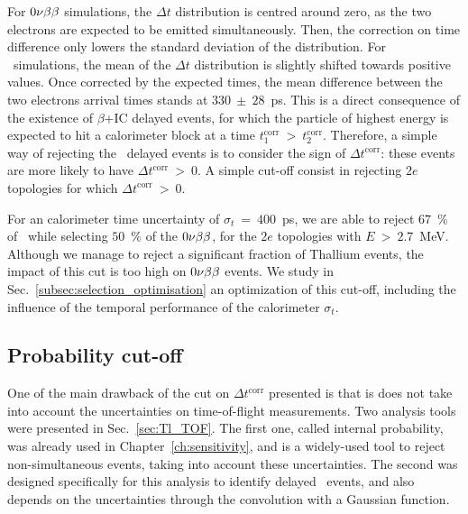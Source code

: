 For $0\nu\beta\beta$ simulations, the $\Delta t$ distribution is centred around zero, as the two electrons are expected to be emitted simultaneously.
Then, the correction on time difference only lowers the standard deviation of the distribution.
For \Tl\ simulations, the mean of the $\Delta t$ distribution is slightly shifted towards positive values.
Once corrected by the expected times, the mean difference between the two electrons arrival times stands at $330~\pm~28$~ps.
This is a direct consequence of the existence of $\beta$+IC delayed events, for which the particle of highest energy is expected to hit a calorimeter block at a time $t^{\text{corr}}_{1}~>~t^{\text{corr}}_{2}$.
Therefore, a simple way of rejecting the \Tl\ delayed events is to consider the sign of $\Delta t^{\text{corr}}$: these events are more likely to have $\Delta t^{\text{corr}}~>~0$.
A simple cut-off consist in rejecting $2e$ topologies for which $\Delta t^{\text{corr}}~>~0$.

For an calorimeter time uncertainty of $\sigma_{t}~=~400$~ps, we are able to reject $67$~\% of \Tl\, while selecting $50$~\% of the $0\nu\beta\beta$, for the $2e$ topologies with $E~>~2.7$~MeV.
Although we manage to reject a significant fraction of Thallium events, the impact of this cut is too high on $0\nu\beta\beta$ events.
We study in Sec.~\ref{subsec:selection_optimisation} an optimization of this cut-off, including the influence of the temporal performance of the calorimeter $\sigma_{t}$.

\subsection{Probability cut-off}

One of the main drawback of the cut on $\Delta t^{\text{corr}}$ presented is that is does not take into account the uncertainties on time-of-flight measurements.
Two analysis tools were presented in Sec.~\ref{sec:Tl_TOF}.
The first one, called internal probability, was already used in Chapter~\ref{ch:sensitivity}, and is a widely-used tool to reject non-simultaneous events, taking into account these uncertainties.
The second was designed specifically for this analysis to identify delayed \Tl\ events, and also depends on the uncertainties through the convolution with a Gaussian function.


